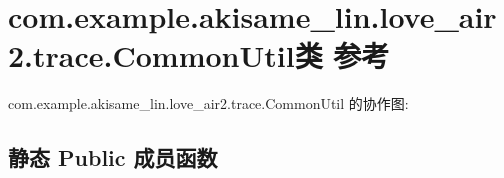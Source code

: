 \hypertarget{classcom_1_1example_1_1akisame__lin_1_1love__air2_1_1trace_1_1_common_util}{}\section{com.\+example.\+akisame\+\_\+lin.\+love\+\_\+air2.\+trace.\+Common\+Util类 参考}
\label{classcom_1_1example_1_1akisame__lin_1_1love__air2_1_1trace_1_1_common_util}


com.\+example.\+akisame\+\_\+lin.\+love\+\_\+air2.\+trace.\+Common\+Util 的协作图\+:
\subsection*{静态 Public 成员函数}
